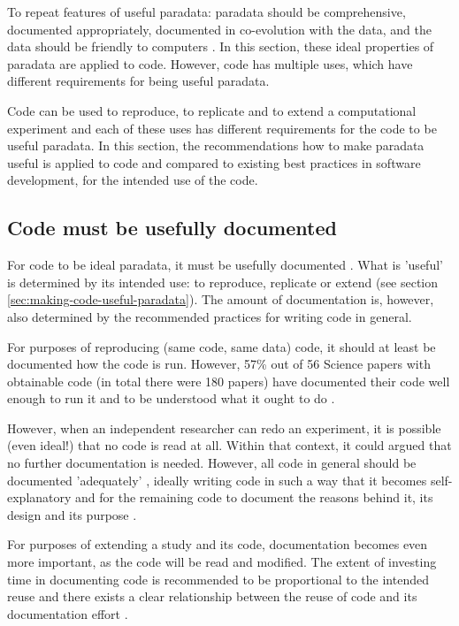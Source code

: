 To repeat features of useful paradata: paradata should be comprehensive, 
documented appropriately, documented in co-evolution with the data,
and the data should be friendly to computers \cite{huvila2022improving}.
In this section, these ideal properties of paradata are applied to code.
However, code has multiple uses, which have different requirements
for being useful paradata.

Code can be used to reproduce, to replicate and to 
extend a computational experiment \cite{benureau2018re} and
each of these uses has different requirements for the code to be useful paradata.
In this section, the recommendations how to make paradata useful
is applied to code and compared to existing best practices in software 
development, for the intended use of the code.

\subsection{Code must be usefully documented}

For code to be ideal paradata, it must be usefully 
documented \cite{huvila2022improving}.
What is 'useful' is determined by its intended use: 
to reproduce, replicate or extend (see section \ref{sec:making-code-useful-paradata}).
The amount of documentation is, however, also determined
by the recommended practices for writing code in general. 

For purposes of reproducing (same code, same data) code,
it should at least be documented how the code is run.
However, 57\% out of 56 Science papers with obtainable code (in 
total there were 180 papers) have documented their code well enough to run it 
and to be understood what it ought to do \cite{stodden2018empirical}.

However, when an independent researcher can redo an experiment, 
it is possible (even ideal!) that no code is read at all.
Within that context, it could argued that no further documentation is needed.
However, all code in general should be documented 
'adequately' \cite{peng2006reproducible},
ideally writing code in such a way that it becomes 
self-explanatory \cite{wilson2014best}
and for the remaining code to document the reasons behind it, 
its design and its purpose \cite{wilson2014best}.

For purposes of extending a study and its code, 
documentation becomes even more important,
as the code will be read and modified.
The extent of investing time in documenting code is recommended
to be proportional to the intended reuse \cite{pianosi2020successfully}
and there exists a clear relationship between the reuse 
of code and its documentation 
effort \cite{cosentino2017systematic,hata2015characteristics}.

